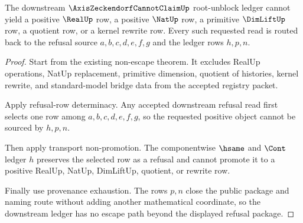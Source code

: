 \begin{theorem}
\label{thm:axis-zeckendorf-root-unblock-ledger-nonescape}
The downstream $\AxisZeckendorfCannotClaimUp$ root-unblock ledger cannot yield a positive $\RealUp$ row, a positive $\NatUp$ row, a primitive $\DimLiftUp$ row, a quotient row, or a kernel rewrite row. Every such requested read is routed back to the refusal source $a,b,c,d,e,f,g$ and the ledger rows $h,p,n$.
\end{theorem}
\begin{proof}
Start from the existing non-escape theorem. It excludes RealUp operations, NatUp replacement, primitive dimension, quotient of histories, kernel rewrite, and standard-model bridge data from the accepted registry packet.

Apply refusal-row determinacy. Any accepted downstream refusal read first selects one row among $a,b,c,d,e,f,g$, so the requested positive object cannot be sourced by $h,p,n$.

Then apply transport non-promotion. The componentwise $\hsame$ and $\Cont$ ledger $h$ preserves the selected row as a refusal and cannot promote it to a positive RealUp, NatUp, DimLiftUp, quotient, or rewrite row.

Finally use provenance exhaustion. The rows $p,n$ close the public package and naming route without adding another mathematical coordinate, so the downstream ledger has no escape path beyond the displayed refusal package.
\end{proof}

